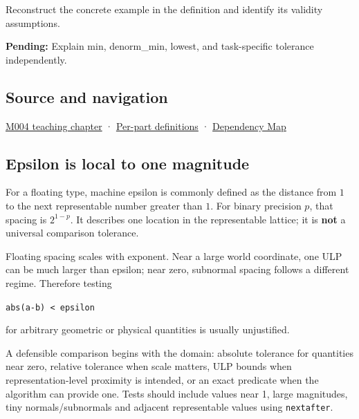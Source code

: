 Reconstruct the concrete example in the definition and identify its validity assumptions.

\textbf{Pending:} Explain min, denorm\_min, lowest, and task-specific tolerance independently.

\subsection{Source and navigation}\label{appendix-390ea641da54-source-and-navigation}

\hyperref[01-foundations-i-ch001-a-stretching-ruler-for-real-valued-quantities]{M004 teaching chapter} · \hyperref[appendix-fd090d982a15-m004---parts-61-76]{Per-part definitions} · \hyperref[appendix-4ad47bdd269a]{Dependency Map}

\subsection{Epsilon is local to one magnitude}\label{appendix-390ea641da54-epsilon-is-local-to-one-magnitude}

For a floating type, machine epsilon is commonly defined as the distance from \(1\) to the next representable number greater than \(1\). For binary precision \(p\), that spacing is \(2^{1-p}\). It describes one location in the representable lattice; it is \textbf{not} a universal comparison tolerance.

Floating spacing scales with exponent. Near a large world coordinate, one ULP can be much larger than epsilon; near zero, subnormal spacing follows a different regime. Therefore testing

\texttt{abs(a-b)\ \textless{}\ epsilon}

for arbitrary geometric or physical quantities is usually unjustified.

A defensible comparison begins with the domain: absolute tolerance for quantities near zero, relative tolerance when scale matters, ULP bounds when representation-level proximity is intended, or an exact predicate when the algorithm can provide one. Tests should include values near 1, large magnitudes, tiny normals/subnormals and adjacent representable values using \texttt{nextafter}.
